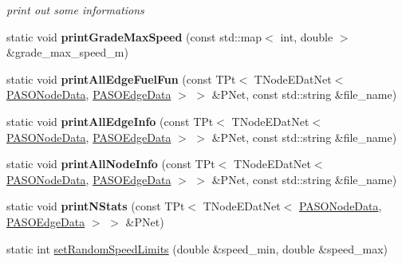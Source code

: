 \begin{DoxyCompactItemize}
\begin{DoxyCompactList}\small\item\em print out some informations \end{DoxyCompactList}\item 
\hypertarget{class_p_a_s_o_util_ac7cea435558100308c822238aa8bad7b}{}static void {\bfseries print\+Grade\+Max\+Speed} (const std\+::map$<$ int, double $>$ \&grade\+\_\+max\+\_\+speed\+\_\+m)\label{class_p_a_s_o_util_ac7cea435558100308c822238aa8bad7b}

\item 
\hypertarget{class_p_a_s_o_util_ae5ae791bb7c2c340c8bf224d5b47063e}{}static void {\bfseries print\+All\+Edge\+Fuel\+Fun} (const T\+Pt$<$ T\+Node\+E\+Dat\+Net$<$ \hyperlink{class_p_a_s_o_node_data}{P\+A\+S\+O\+Node\+Data}, \hyperlink{class_p_a_s_o_edge_data}{P\+A\+S\+O\+Edge\+Data} $>$ $>$ \&P\+Net, const std\+::string \&file\+\_\+name)\label{class_p_a_s_o_util_ae5ae791bb7c2c340c8bf224d5b47063e}

\item 
\hypertarget{class_p_a_s_o_util_ab119c05d45dd5fbb1a004203860339ef}{}static void {\bfseries print\+All\+Edge\+Info} (const T\+Pt$<$ T\+Node\+E\+Dat\+Net$<$ \hyperlink{class_p_a_s_o_node_data}{P\+A\+S\+O\+Node\+Data}, \hyperlink{class_p_a_s_o_edge_data}{P\+A\+S\+O\+Edge\+Data} $>$ $>$ \&P\+Net, const std\+::string \&file\+\_\+name)\label{class_p_a_s_o_util_ab119c05d45dd5fbb1a004203860339ef}

\item 
\hypertarget{class_p_a_s_o_util_acad92539b416977986bef90fdbfdc400}{}static void {\bfseries print\+All\+Node\+Info} (const T\+Pt$<$ T\+Node\+E\+Dat\+Net$<$ \hyperlink{class_p_a_s_o_node_data}{P\+A\+S\+O\+Node\+Data}, \hyperlink{class_p_a_s_o_edge_data}{P\+A\+S\+O\+Edge\+Data} $>$ $>$ \&P\+Net, const std\+::string \&file\+\_\+name)\label{class_p_a_s_o_util_acad92539b416977986bef90fdbfdc400}

\item 
\hypertarget{class_p_a_s_o_util_abb1036cbf4196126605577533ce9aded}{}static void {\bfseries print\+N\+Stats} (const T\+Pt$<$ T\+Node\+E\+Dat\+Net$<$ \hyperlink{class_p_a_s_o_node_data}{P\+A\+S\+O\+Node\+Data}, \hyperlink{class_p_a_s_o_edge_data}{P\+A\+S\+O\+Edge\+Data} $>$ $>$ \&P\+Net)\label{class_p_a_s_o_util_abb1036cbf4196126605577533ce9aded}

\item 
\hypertarget{class_p_a_s_o_util_afd052a076f1c4b31ad1713b2a4624dde}{}static int \hyperlink{class_p_a_s_o_util_afd052a076f1c4b31ad1713b2a4624dde}{set\+Random\+Speed\+Limits} (double \&speed\+\_\+min, double \&speed\+\_\+max)\label{class_p_a_s_o_util_afd052a076f1c4b31ad1713b2a4624dde}


\end{DoxyCompactItemize}
